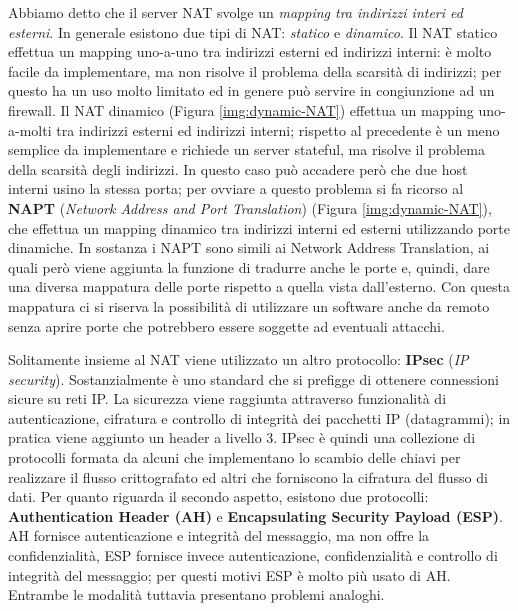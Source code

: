 Abbiamo detto che il server NAT svolge un \textit{mapping tra indirizzi interi ed esterni}. In generale esistono due tipi di NAT: \textit{statico} e \textit{dinamico}. Il NAT statico effettua un mapping uno-a-uno tra indirizzi esterni ed indirizzi interni: è molto facile da implementare, ma non risolve il problema della scarsità di indirizzi; per questo ha un uso molto limitato ed in genere può servire in congiunzione ad un firewall. Il NAT dinamico (Figura \ref{img:dynamic-NAT}) effettua un mapping uno-a-molti tra indirizzi esterni ed indirizzi interni; rispetto al precedente è un meno semplice da implementare e richiede un server stateful, ma risolve il problema della scarsità degli indirizzi. In questo caso può accadere però che due host interni usino la stessa porta; per ovviare a questo problema si fa ricorso al \textbf{NAPT} (\textit{Network Address and Port Translation}) (Figura \ref{img:dynamic-NAT}), che effettua un mapping dinamico tra indirizzi interni ed esterni utilizzando porte dinamiche. In sostanza i NAPT sono simili ai Network Address Translation, ai quali però viene aggiunta la funzione di tradurre anche le porte e, quindi, dare una diversa mappatura delle porte rispetto a quella vista dall'esterno. Con questa mappatura ci si riserva la possibilità di utilizzare un software anche da remoto senza aprire porte che potrebbero essere soggette ad eventuali attacchi.

Solitamente insieme al NAT viene utilizzato un altro protocollo: \textbf{IPsec} (\textit{IP security}). Sostanzialmente è uno standard che si prefigge di ottenere connessioni sicure su reti IP. La sicurezza viene raggiunta attraverso funzionalità di autenticazione, cifratura e controllo di integrità dei pacchetti IP (datagrammi); in pratica viene aggiunto un header a livello 3. IPsec è quindi una collezione di protocolli formata da alcuni che implementano lo scambio delle chiavi per realizzare il flusso crittografato ed altri che forniscono la cifratura del flusso di dati. Per quanto riguarda il secondo aspetto, esistono due protocolli: \textbf{Authentication Header (AH)} e \textbf{Encapsulating Security Payload (ESP)}. AH fornisce autenticazione e integrità del messaggio, ma non offre la confidenzialità, ESP fornisce invece autenticazione, confidenzialità e controllo di integrità del messaggio; per questi motivi ESP è molto più usato di AH. Entrambe le modalità tuttavia presentano problemi analoghi.

